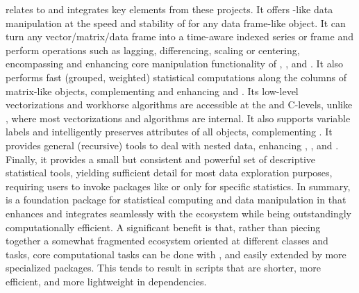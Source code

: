\documentclass[article]{jss}
\begin{document}
 relates to and integrates key elements from these projects. It offers -like data manipulation at the speed and stability of  for any data frame-like object. It can turn any vector/matrix/data frame into a time-aware indexed series or frame and perform operations such as lagging, differencing, scaling or centering, encompassing and enhancing core manipulation functionality of , , and . It also performs fast (grouped, weighted) statistical computations along the columns of matrix-like objects, complementing and enhancing  and . Its low-level vectorizations and workhorse algorithms are accessible at the  and C-levels, unlike , where most vectorizations and algorithms are internal. It also supports variable labels and intelligently preserves attributes of all objects, complementing . It provides general (recursive) tools to deal with nested data, enhancing , , and . Finally, it provides a small but consistent and powerful set of descriptive statistical tools, yielding sufficient detail for most data exploration purposes, requiring users to invoke packages like  or  only for specific statistics. In summary,  is a foundation package for statistical computing and data manipulation in  that enhances and integrates seamlessly with the  ecosystem while being outstandingly computationally efficient. A significant benefit is that, rather than piecing together a somewhat fragmented ecosystem oriented at different classes and tasks, core computational tasks can be done with , and easily extended by more specialized packages. This tends to result in  scripts that are shorter, more efficient, and more lightweight in dependencies. \newline
\end{document}

